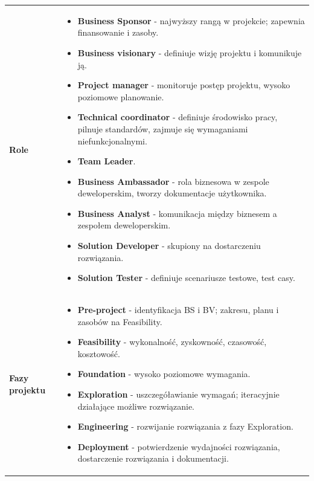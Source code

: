 \documentclass[a4paper]{article}
\begin{document}
    \begin{table}[H]
        \begin{center}
            \begin{tabular}{ p{2.5cm} p{13.5cm}}
                \textbf{Role}
                &
                \begin{itemize}
                    \item \textbf{Business Sponsor} - najwyższy rangą w projekcie; zapewnia finansowanie i zasoby.
                    \item \textbf{Business visionary} - definiuje wizję projektu i komunikuje ją.
                    \item \textbf{Project manager} - monitoruje postęp projektu, wysoko poziomowe planowanie.
                    \item \textbf{Technical coordinator} - definiuje środowisko pracy, pilnuje standardów, zajmuje się wymaganiami niefunkcjonalnymi.
                    \item \textbf{Team Leader}.
                    \item \textbf{Business Ambassador} - rola biznesowa w zespole deweloperskim, tworzy dokumentacje użytkownika.
                    \item \textbf{Business Analyst} - komunikacja między biznesem a zespołem deweloperskim.
                    \item \textbf{Solution Developer} - skupiony na dostarczeniu rozwiązania.
                    \item \textbf{Solution Tester} - definiuje scenariusze testowe, test casy.
                \end{itemize}
                \\

                \textbf{Fazy projektu}
                &
                \begin{itemize}
                    \item \textbf{Pre-project} - identyfikacja BS i BV; zakresu, planu i zasobów na Feasibility.
                    \item \textbf{Feasibility} - wykonalność, zyskowność, czasowość, kosztowość.
                    \item \textbf{Foundation} - wysoko poziomowe wymagania.
                    \item \textbf{Exploration} - uszczegóławianie wymagań; iteracyjnie działające możliwe rozwiązanie.
                    \item \textbf{Engineering} - rozwijanie rozwiązania z fazy Exploration.
                    \item \textbf{Deployment} - potwierdzenie wydajności rozwiązania, dostarczenie rozwiązania i dokumentacji.
                \end{itemize}
                \\
            \end{tabular}
        \end{center}
    \end{table}
\end{document}
